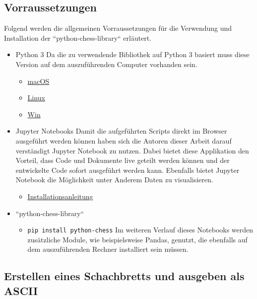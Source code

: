 \subsection{Vorraussetzungen}\label{vorraussetzungen}

Folgend werden die allgemeinen Vorraussetzungen für die Verwendung und
Installation der ``python-chess-library`` erläutert.

\begin{itemize}
\tightlist
\item
  Python 3 Da die zu verwendende Bibliothek auf Python 3 basiert muss
  diese Version auf dem auszuführenden Computer vorhanden sein.

  \begin{itemize}
  \tightlist
  \item
    \href{https://wsvincent.com/install-python3-mac/}{macOS}
  \item
    \href{https://docs.python-guide.org/starting/install3/linux/}{Linux}
  \item
    \href{https://realpython.com/installing-python/}{Win}
  \end{itemize}
\item
  Jupyter Notebooks Damit die aufgeführten Scripts direkt im Browser
  ausgeführt werden können haben sich die Autoren dieser Arbeit darauf
  verständigt Jupyter Notebook zu nutzen. Dabei bietet diese Applikation
  den Vorteil, dass Code und Dokumente live geteilt werden können und
  der entwickelte Code sofort ausgeführt werden kann. Ebenfalls bietet
  Jupyter Notebook die Möglichkeit unter Anderem Daten zu visualisieren.

  \begin{itemize}
  \tightlist
  \item
    \href{https://jupyter.org/install}{Installationsanleitung}
  \end{itemize}
\item
  ``python-chess-library``

  \begin{itemize}
  \tightlist
  \item
    \texttt{pip\ install\ python-chess} Im weiteren Verlauf dieses
    Notebooks werden zusätzliche Module, wie beispielsweise Pandas,
    genutzt, die ebenfalls auf dem auszuführenden Rechner installiert
    sein müssen.
  \end{itemize}
\end{itemize}

    \subsection{Erstellen eines Schachbretts und ausgeben als
ASCII}\label{erstellen-eines-schachbretts-und-ausgeben-als-ascii}

